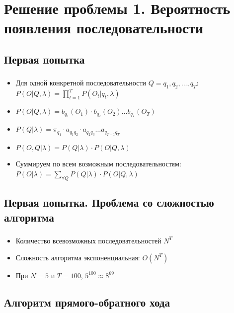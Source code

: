 \documentclass{beamer}
\begin{document}
\section{Решение проблемы 1. Вероятность появления последовательности}
\subsection{Первая попытка}

\begin{frame} 
  \frametitle{\insertsection}
  \framesubtitle{\insertsubsection}
  \begin{itemize}
  \item Для одной конкретной последовательности $Q = q_1, q_2, \ldots, q_T$: \\ $\displaystyle P(O | Q, \lambda) = \prod_{t = 1}^{T} P(O_t | q_t, \lambda)$
    \pause
  \item $\displaystyle P(O | Q, \lambda) = b_{q_1}(O_1) \cdot b_{q_2}(O_2) \ldots b_{q_T}(O_T)$ \pause
  \item $\displaystyle P(Q | \lambda) = \pi_{q_1} \cdot a_{q_1q_2} \cdot a_{q_2q_3} \ldots a_{q_{T - 1}q_T}$ \pause
  \item $\displaystyle P(O, Q | \lambda) = P(Q | \lambda) \cdot P(O | Q, \lambda)$
    \pause
  \item Суммируем по всем возможным последовательностям: $\displaystyle P(O | \lambda) = \sum_{\forall Q} P(Q | \lambda) \cdot P(O | Q, \lambda)$
  \end{itemize}
\end{frame}

\subsection{Первая попытка. Проблема со сложностью алгоритма}

\begin{frame} 
  \frametitle{\insertsection}
  \framesubtitle{\insertsubsection}
  \begin{itemize}
  \item Количество всевозможных последовательностей $N^T$ \pause
  \item Сложность алгоритма экспоненциальная: $O(N^T)$
  \item При $N = 5$ и  $T = 100$, $5^{100} \approx 8^{69}$
  \end{itemize}
\end{frame}

\subsection{Алгоритм прямого-обратного хода}
\end{document}
